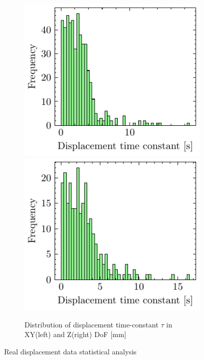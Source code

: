 \begin{figure}[H]
    \begin{subfigure}{\linewidth}
    \includegraphics[width=.5\linewidth]{images/fig_chapter4/data_dist/5.pdf}\hfill
    \includegraphics[width=.5\linewidth]{images/fig_chapter4/data_dist/6.pdf}
    \caption{Distribution of displacement time-constant $ \tau $ in XY(left) and Z(right) DoF [mm]}
    \end{subfigure}
\caption{Real displacement data statistical analysis}
\label{fig:dist_disp}
\end{figure}

